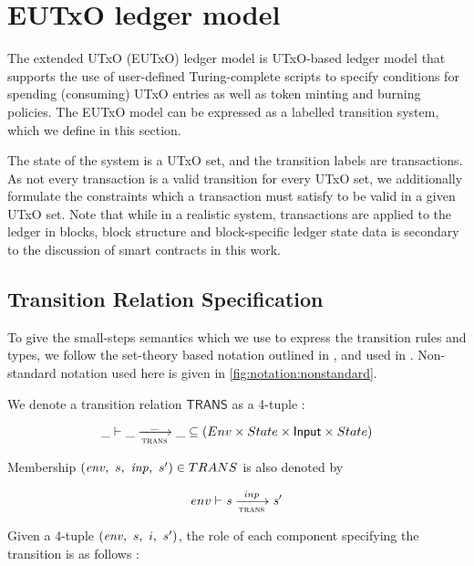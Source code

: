 \section{EUTxO ledger model}
\label{sec:ledger-rules}

The extended UTxO (EUTxO) ledger model is UTxO-based ledger model that supports the use of
user-defined Turing-complete scripts to specify conditions for spending (consuming)
UTxO entries as well as token minting and burning policies.
The EUTxO model can be expressed as a labelled transition system, which we define
in this section.

The state of the system is a UTxO set, and the transition labels are transactions.
As not every transaction is a valid transition for every UTxO set, we additionally
formulate the constraints which a transaction must satisfy to be valid in a given
UTxO set. Note that while in a realistic system, transactions are applied to the
ledger in blocks, block structure and block-specific ledger state data is secondary
to the discussion of smart contracts in this work.

\subsection{Transition Relation Specification}

To give the small-steps semantics which we use to express the transition
rules and types, we follow the set-theory based notation
outlined in \cite{steps}, and used in \cite{alonzo} \cite{structured}.
Non-standard notation used here is given in \ref{fig:notation:nonstandard}.

We denote a transition relation $\mathsf{TRANS}$ as a 4-tuple :

  \begin{equation*}
    \_ \vdash
    \var{\_} \trans{trans}{\_} \var{\_}
    \subseteq (\Env \times \State \times \Input \times \State)
  \end{equation*}

Membership $(\var{env},~s,~\var{inp},~s') \in \mathsf{TRANS}$ is also denoted by

  \begin{equation*}
    env \vdash
    \var{s} \trans{trans}{inp} \var{s'}
  \end{equation*}

Given a 4-tuple $(\mathit{env},~s,~i,~s')$, the role of each component
specifying the transition is as follows :

